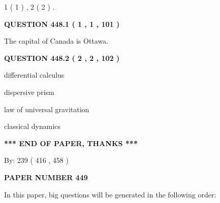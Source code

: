 \documentclass[12pt]{article}
\begin{document}
   
   1 ( 1 )
 ,
   2 ( 2 )
 .
  
\vspace{0.2in}
  
{\textbf{\Large{QUESTION
448.1 
 ( 1 , 1 , 101 )
}}}
  
  
 
 
\noindent{}
 
 
The capital of Canada is Ottawa.
 
 
 
 
  
\vspace{0.2in}
  
{\textbf{\Large{QUESTION
448.2 
 ( 2 , 2 , 102 )
}}}
  
  
 
 
\noindent{}
 
 
differential calculus
 
 
dispersive prism
 
 
law of universal gravitation
 
 
classical dynamics
 
 
 
 
   
   
\vspace{1.0in} 
{\textbf{\large{ *** END OF PAPER, THANKS *** }}} 
   
   
\hspace{1.0in} By: 
 239 ( 416 ,  458 )
   
   
   
   
\newpage 
\setcounter{page}{ 
   449001 } 
   
   
   
   
 {\textbf{ \Large{ PAPER NUMBER  449  }}}
   
   
\vspace{0.2in}
   
   
   
   
   
\vspace{0.2in}
   
In this paper, big questions will be generated in the following order: 
   
\end{document}
